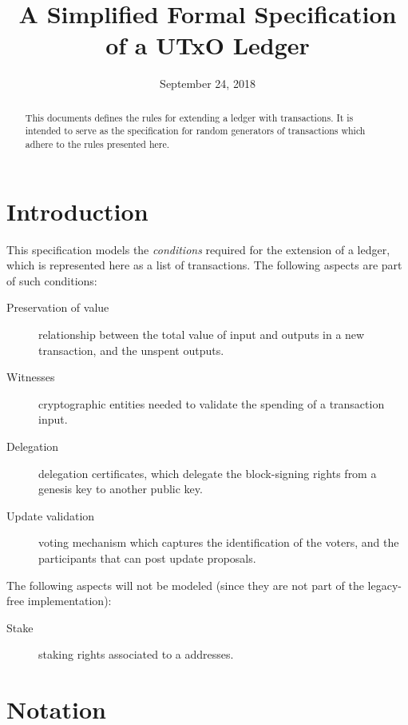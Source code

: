 \documentclass[11pt,a4paper]{article}
\begin{document}
\title{A Simplified Formal Specification of a UTxO Ledger}

\author{}

\date{September 24, 2018}

\maketitle

\begin{abstract}
This documents defines the rules for extending a ledger with transactions. It
is intended to serve as the specification for random generators of transactions
which adhere to the rules presented here.
\end{abstract}

\tableofcontents
\listoffigures

\section{Introduction}
\label{sec:introduction}

This specification models the \textit{conditions} required for the extension of
a ledger, which is represented here as a list of transactions. The following
aspects are part of such conditions:

\begin{description}
\item[Preservation of value] relationship between the total value of input and outputs
  in a new transaction, and the unspent outputs.
\item[Witnesses] cryptographic entities needed to validate the spending
  of a transaction input.
\item[Delegation] delegation certificates, which delegate the block-signing
  rights from a genesis key to another public key.
\item[Update validation] voting mechanism which captures the identification of
  the voters, and the participants that can post update proposals.
\end{description}

The following aspects will not be modeled (since they are not part of the legacy-free
implementation):
\begin{description}
\item[Stake] staking rights associated to a addresses.
\end{description}

\section{Notation}\label{sec:notation}
\end{document}
